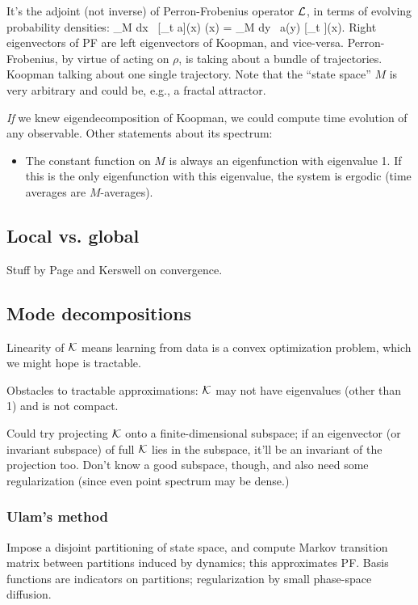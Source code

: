 \documentclass[notitlepage,openany,11pt]{report}
\theoremstyle{plain}%
\numberwithin{equation}{section}
\begin{document}
It's the adjoint (not inverse) of Perron-Frobenius operator $\mathcal{L}$, in terms of evolving probability densities:
\be
\int_{M} \! dx \, [_t a](x) \rho(x) = \int_{M} \! dy \, a(y) [_t \rho](x).
\ee
Right eigenvectors of PF are left eigenvectors of Koopman, and vice-versa. Perron-Frobenius, by virtue of acting on $\rho$, is taking about a bundle of trajectories. Koopman talking about one single trajectory. Note that the ``state space'' $M$ is very arbitrary and could be, e.g., a fractal attractor.

\emph{If} we knew eigendecomposition of Koopman, we could compute time evolution of any observable. Other statements about its spectrum:
\begin{itemize} \itemsep -1pt
\item The constant function on $M$ is always an eigenfunction with eigenvalue 1. If this is the only eigenfunction with this eigenvalue, the system is ergodic (time averages are $M$-averages).
\end{itemize}


\subsection{Local vs. global}
Stuff by Page and Kerswell on convergence.

\subsection{Mode decompositions}
Linearity of $\mathcal{K}$ means learning from data is a convex optimization problem, which we might hope is tractable.

Obstacles to tractable approximations: $\mathcal{K}$ may not have eigenvalues (other than 1) and is not compact.

Could try projecting $\mathcal{K}$ onto a finite-dimensional subspace; if an eigenvector (or invariant subspace) of full $\mathcal{K}$ lies in the subspace, it'll be an invariant of the projection too. Don't know a good subspace, though, and also need some regularization (since even point spectrum may be dense.)

\subsubsection{Ulam's method} Impose a disjoint partitioning of state space, and compute Markov transition matrix between partitions induced by dynamics; this approximates PF. Basis functions are indicators on partitions; regularization by small phase-space diffusion. 
\end{document}
